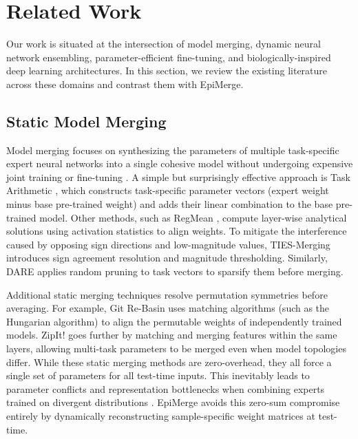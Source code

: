 \section{Related Work}
\label{sec:related_work}

Our work is situated at the intersection of model merging, dynamic neural network ensembling, parameter-efficient fine-tuning, and biologically-inspired deep learning architectures. In this section, we review the existing literature across these domains and contrast them with EpiMerge.

\subsection{Static Model Merging}
Model merging focuses on synthesizing the parameters of multiple task-specific expert neural networks into a single cohesive model without undergoing expensive joint training or fine-tuning \cite{langley00}. A simple but surprisingly effective approach is Task Arithmetic \cite{task_arithmetic}, which constructs task-specific parameter vectors (expert weight minus base pre-trained weight) and adds their linear combination to the base pre-trained model. Other methods, such as RegMean \cite{regmean}, compute layer-wise analytical solutions using activation statistics to align weights. To mitigate the interference caused by opposing sign directions and low-magnitude values, TIES-Merging \cite{ties} introduces sign agreement resolution and magnitude thresholding. Similarly, DARE \cite{dare} applies random pruning to task vectors to sparsify them before merging. 

Additional static merging techniques resolve permutation symmetries before averaging. For example, Git Re-Basin \cite{git_rebasin} uses matching algorithms (such as the Hungarian algorithm) to align the permutable weights of independently trained models. ZipIt! \cite{zipit} goes further by matching and merging features within the same layers, allowing multi-task parameters to be merged even when model topologies differ. While these static merging methods are zero-overhead, they all force a single set of parameters for all test-time inputs. This inevitably leads to parameter conflicts and representation bottlenecks when combining experts trained on divergent distributions \cite{representation_collapse, adamerging}. EpiMerge avoids this zero-sum compromise entirely by dynamically reconstructing sample-specific weight matrices at test-time.

